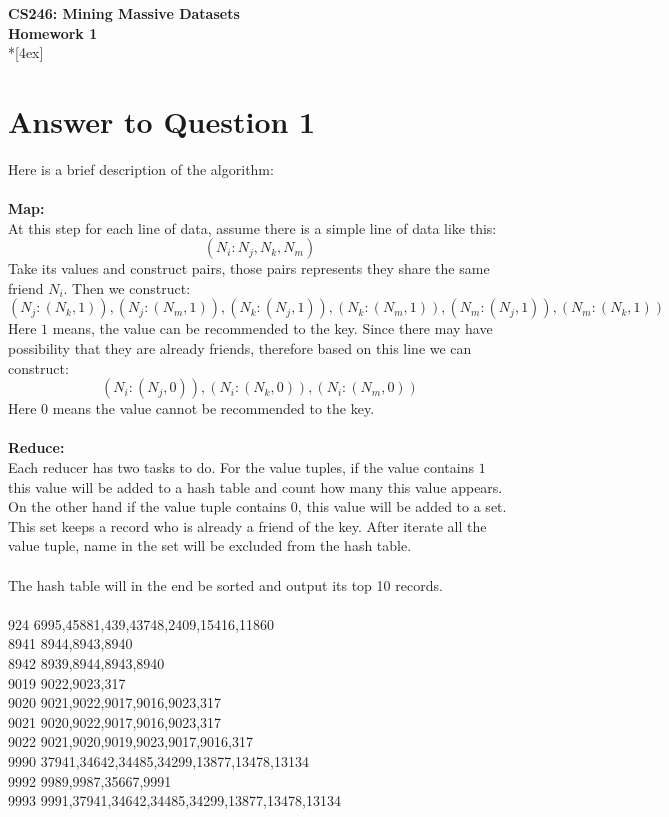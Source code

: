 \documentclass[11pt]{article}
\begin{document}
\thispagestyle{empty}
\parindent 0pt
\vfill
\large

\begin{center}
\LARGE{\bf \textsf{CS246: Mining Massive Datasets}}\\ {\bf \textsf{Homework 1}} 
\\*[4ex]
\end{center}

\section*{Answer to Question 1}
Here is a brief description of the algorithm:\\
\\
\textbf{Map:}\\
At this step for each line of data, assume there is a simple line of data like this:
$$
    (N_{i}: N_{j}, N_{k}, N_{m})
$$
Take its values and construct pairs, those pairs represents they share the same friend $N_i$. Then we construct:
$$
 (N_j: (N_k, 1)), (N_j: (N_m, 1)), (N_k: (N_j, 1)), (N_k: (N_m, 1)), (N_m: (N_j, 1)), (N_m: (N_k, 1))
$$
Here $1$ means, the value can be recommended to the key. Since there may have possibility that they are already friends, 
therefore based on this line we can construct:
$$
 (N_i:(N_j, 0)), (N_i:(N_k, 0)), (N_i:(N_m, 0))
$$
Here $0$ means the value cannot be recommended to the key.\\
\\
\textbf{Reduce:}\\
Each reducer has two tasks to do. For the value tuples, 
if the value contains $1$ this value will be added to a hash table and count how many this value appears.
On the other hand if the value tuple contains $0$, this value will be added to a set. 
This set keeps a record who is already a friend of the key. 
After iterate all the value tuple, name in the set will be excluded from the hash table.\\
\\
The hash table will in the end be sorted and output its top 10 records.\\
\\
924	6995,45881,439,43748,2409,15416,11860\\
8941 8944,8943,8940\\
8942 8939,8944,8943,8940\\
9019	9022,9023,317\\
9020	9021,9022,9017,9016,9023,317\\
9021	9020,9022,9017,9016,9023,317\\
9022	9021,9020,9019,9023,9017,9016,317\\
9990	37941,34642,34485,34299,13877,13478,13134\\
9992	9989,9987,35667,9991\\
9993	9991,37941,34642,34485,34299,13877,13478,13134\\
\end{document}
